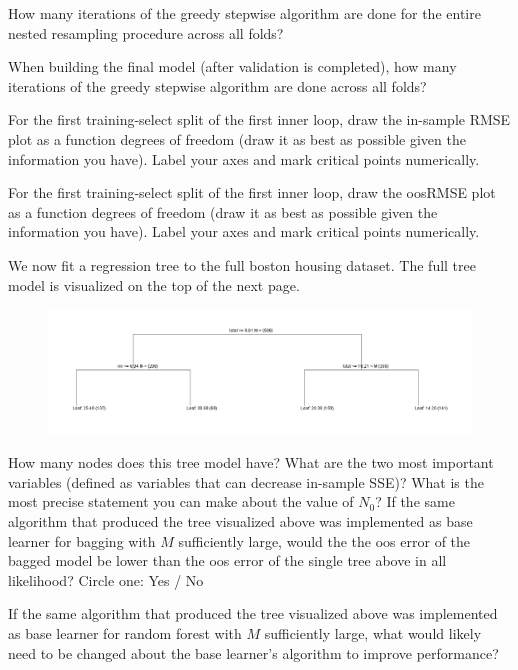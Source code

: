\documentclass[12pt]{article}
\begin{document}
 How many iterations of the greedy stepwise algorithm are done for the entire nested resampling procedure across all folds?

 When building the final model (after validation is completed), how many iterations of the greedy stepwise algorithm are done across all folds?


 For the first training-select split of the first inner loop, draw the in-sample RMSE plot as a function degrees of freedom (draw it as best as possible given the information you have). Label your axes and mark critical points numerically. 

 For the first training-select split of the first inner loop, draw the oosRMSE plot as a function degrees of freedom (draw it as best as possible given the information you have). Label your axes and mark critical points numerically.

We now fit a regression tree to the full boston housing dataset. The full tree model is visualized on the top of the next page.
 
\begin{figure}[htp]
\centering
\hspace*{-2cm}\includegraphics[width=8.2in]{tree.png}
\end{figure} 

 How many nodes does this tree model have?
 What are the two most important variables (defined as variables that can decrease in-sample SSE)?
 What is the most precise statement you can make about the value of $N_0$?
 If the same algorithm that produced the tree visualized above was implemented as base learner for bagging with $M$ sufficiently large, would the the oos error of the bagged model be lower than the oos error of the single tree above in all likelihood? Circle one: Yes / No 

 If the same algorithm that produced the tree visualized above was implemented as base learner for random forest with $M$ sufficiently large, what would likely need to be changed about the base learner's algorithm to improve performance? 
\end{document}
